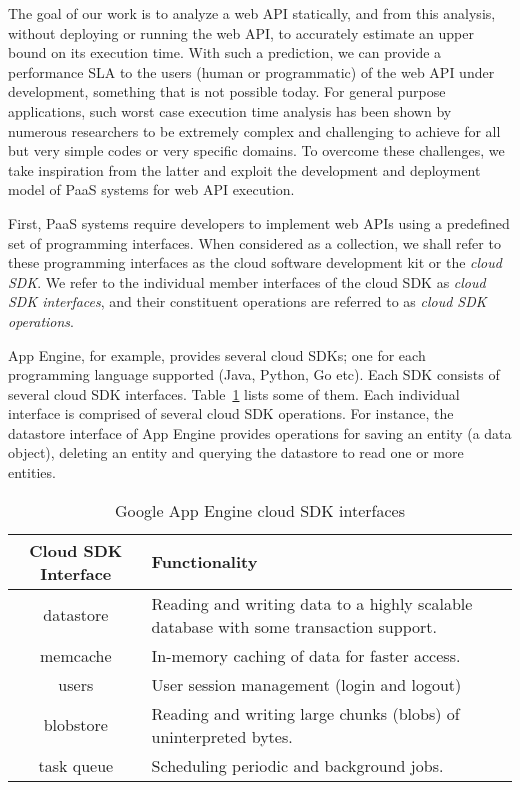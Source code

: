 The goal of our work is to analyze a web API statically, and from this analysis, 
without deploying or running the web API, 
to accurately estimate an upper bound on its execution time. With such a prediction,
we can provide a performance SLA to the users (human or 
programmatic) of the web API under development, something that is not possible today.
For general purpose applications, such worst case execution time analysis has been shown
by numerous researchers to be extremely complex and challenging to achieve for all but 
very simple codes or very specific domains.
To overcome these challenges, we take inspiration from the latter and exploit 
the development and deployment model of PaaS systems for web API execution.

First, PaaS systems require developers
to implement web APIs using a predefined set of 
programming interfaces. When considered as a
collection, we shall refer to these programming interfaces as the cloud software development 
kit or the \textit{cloud SDK}. We refer to the individual member interfaces of the cloud SDK
as \textit{cloud SDK interfaces}, and their constituent operations are referred to as \textit{cloud SDK operations}.

App Engine, for example, provides several cloud SDKs; one for each
programming language supported (Java, Python, Go etc). Each SDK consists of
several cloud SDK interfaces. Table~\ref{tab:gae_cloud_sdk} lists some of them.
Each individual interface is comprised of several cloud SDK operations. For instance, the 
datastore interface of App Engine provides operations for saving an entity (a data object),
deleting an entity and querying the datastore to read one or more entities.

\begin{table}[htdp]
\caption{Google App Engine cloud SDK interfaces}
\begin{center}
\begin{tabular}{|c|p{5cm}|}
\hline
Cloud SDK Interface & Functionality \\ \hline
datastore & Reading and writing data to a highly scalable database with some transaction support. \\ \hline
memcache & In-memory caching of data for faster access.\\ \hline
users & User session management (login and logout)\\ \hline
blobstore & Reading and writing large chunks (blobs) of uninterpreted bytes.\\ \hline
task queue & Scheduling periodic and background jobs.\\ \hline
\end{tabular}
\end{center}
\label{tab:gae_cloud_sdk}
\end{table}

